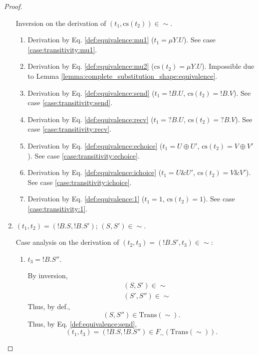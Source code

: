 \documentclass{llncs}
\newcommand*{\Trans}{\mathrm{Trans}}
\newcommand*{\cs}{\mathrm{cs}}
\newcommand*{\sequiv}{\sim}
\newcommand*{\send}{\mathord{!}}
\newcommand*{\recv}{\mathord{?}}
\newcommand*{\echoice}{\oplus}
\newcommand*{\ichoice}{\mathop{\&}}
\renewcommand*{\|}{\;|\;}
\begin{document}
\begin{proof}
\begin{enumerate}
      Inversion on the derivation of $(t_1, \cs(t_2)) \in \sequiv$.
      \begin{enumerate}
        \item Derivation by Eq. \ref{def:equivalence:mu1}
          ($t_1 = \mu Y.U$).
          See case \ref{case:transitivity:mu1}.
        \item Derivation by Eq. \ref{def:equivalence:mu2}
          ($\cs(t_2) = \mu Y.U$).
          Impossible due to Lemma \ref{lemma:complete_substitution_shape:equivalence}.
        \item Derivation by Eq. \ref{def:equivalence:send}
          ($t_1 = \send B.U$, $\cs(t_2) = \send B.V$).
          See case \ref{case:transitivity:send}.
        \item Derivation by Eq. \ref{def:equivalence:recv}
          ($t_1 = \recv B.U$, $\cs(t_2) = \recv B.V$).
          See case \ref{case:transitivity:recv}.
        \item Derivation by Eq. \ref{def:equivalence:echoice}
          ($t_1 = U \echoice U'$, $\cs(t_2) = V \echoice V'$).
          See case \ref{case:transitivity:echoice}.
        \item Derivation by Eq. \ref{def:equivalence:ichoice}
          ($t_1 = U \ichoice U'$, $\cs(t_2) = V \ichoice V'$).
          See case \ref{case:transitivity:ichoice}.
        \item Derivation by Eq. \ref{def:equivalence:1}
          ($t_1 = 1$, $\cs(t_2) = 1$).
          See case \ref{case:transitivity:1}.
      \end{enumerate}

    \item
      \label{case:transitivity:send}
      $(t_1, t_2) = (\send B.S, \send B.S')$; $(S, S') \in \sequiv$.

      Case analysis on the derivation of
      $(t_2, t_3) = (\send B.S', t_3) \in \sequiv$:
      \begin{enumerate}
        \item $t_3 = \send B.S''$.

          By inversion,
          \begin{eqnarray*}
            && (S, S') \in \sequiv \\
            && (S', S'') \in \sequiv
          \end{eqnarray*}
          Thus, by def.,
          \begin{equation*}
            (S, S'') \in \Trans(\sequiv).
          \end{equation*}
          Thus, by Eq. \ref{def:equivalence:send},
          \begin{equation*}
            (t_1, t_3) = (\send B.S, \send B.S'') \in F_\sequiv(\Trans(\sequiv)).
          \end{equation*}


\end{enumerate}
\end{enumerate}
\end{proof}
\end{document}
